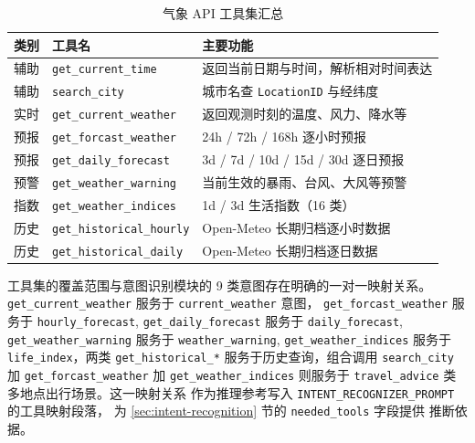 \begin{table}[!ht]
    \centering
    \caption{气象 API 工具集汇总}
    \label{tab:api-tools-overview}
    \song\fontsize{9pt}{12pt}\selectfont
    \renewcommand{\arraystretch}{0.95}
    \begin{tabular}{lll}
        \toprule
        类别 & 工具名 & 主要功能 \\
        \midrule
        辅助 & \texttt{get\_\bk{}current\_\bk{}time} & 返回当前日期与时间，解析相对时间表达 \\
        辅助 & \texttt{search\_\bk{}city} & 城市名查 \texttt{LocationID} 与经纬度 \\
        \midrule
        实时 & \texttt{get\_\bk{}current\_\bk{}weather} & 返回观测时刻的温度、风力、降水等 \\
        预报 & \texttt{get\_\bk{}forcast\_\bk{}weather} & 24h / 72h / 168h 逐小时预报 \\
        预报 & \texttt{get\_\bk{}daily\_\bk{}forecast} & 3d / 7d / 10d / 15d / 30d 逐日预报 \\
        预警 & \texttt{get\_\bk{}weather\_\bk{}warning} & 当前生效的暴雨、台风、大风等预警 \\
        指数 & \texttt{get\_\bk{}weather\_\bk{}indices} & 1d / 3d 生活指数（16 类） \\
        \midrule
        历史 & \texttt{get\_\bk{}historical\_\bk{}hourly} & Open-Meteo 长期归档逐小时数据 \\
        历史 & \texttt{get\_\bk{}historical\_\bk{}daily} & Open-Meteo 长期归档逐日数据 \\
        \bottomrule
    \end{tabular}
\end{table}

工具集的覆盖范围与意图识别模块的 9 类意图存在明确的一对一映射关系。
\texttt{get\_\bk{}current\_\bk{}weather} 服务于 \texttt{current\_\bk{}weather} 意图，
\texttt{get\_\bk{}forcast\_\bk{}weather} 服务于 \texttt{hourly\_\bk{}forecast},
\texttt{get\_\bk{}daily\_\bk{}forecast} 服务于 \texttt{daily\_\bk{}forecast},
\texttt{get\_\bk{}weather\_\bk{}warning} 服务于 \texttt{weather\_\bk{}warning},
\texttt{get\_\bk{}weather\_\bk{}indices} 服务于 \texttt{life\_\bk{}index}，两类
\texttt{get\_\bk{}historical\_\bk{}*} 服务于历史查询，组合调用 \texttt{search\_\bk{}city}
加 \texttt{get\_\bk{}forcast\_\bk{}weather} 加 \texttt{get\_\bk{}weather\_\bk{}indices}
则服务于 \texttt{travel\_\bk{}advice} 类多地点出行场景。这一映射关系
作为推理参考写入 \texttt{INTENT\_\bk{}RECOGNIZER\_\bk{}PROMPT} 的工具映射段落，
为 \ref{sec:intent-recognition} 节的 \texttt{needed\_\bk{}tools} 字段提供
推断依据。

